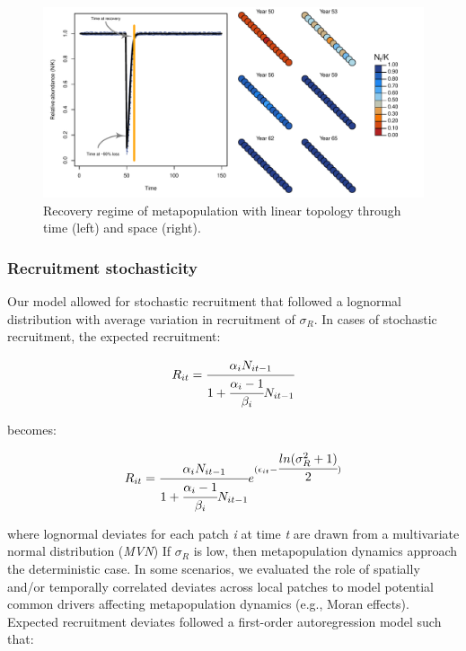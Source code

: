 \documentclass[
]{article}
\begin{document}
\begin{figure}[H]

{\centering \includegraphics{Managing_for_ecological_surprises_in_metapopulations_files/figure-latex/example disturbance regime-1} 

}

\caption{Recovery regime of metapopulation with linear topology through time (left) and space (right).}\label{fig:example disturbance regime}
\end{figure}

\hypertarget{recruitment-stochasticity}{%
\subsubsection{Recruitment
stochasticity}\label{recruitment-stochasticity}}

Our model allowed for stochastic recruitment that followed a lognormal
distribution with average variation in recruitment of \(\sigma_R\). In
cases of stochastic recruitment, the expected recruitment:

\begin{align}
R_{it}=\cfrac{\alpha_iN_{it-1}}{1+\cfrac{\alpha_i-1}{\beta_i}N_{it-1}}
\end{align}

becomes:

\begin{align}
R_{it}=\cfrac{\alpha_iN_{it-1}}{1+\cfrac{\alpha_i-1}{\beta_i}N_{it-1}}e^{(\epsilon_{it}-\cfrac{ln(\sigma_{R}^2+1)}{2})}
\end{align}

where lognormal deviates for each patch \emph{i} at time \emph{t} are
drawn from a multivariate normal distribution (\emph{MVN}) If
\(\sigma_R\) is low, then metapopulation dynamics approach the
deterministic case. In some scenarios, we evaluated the role of
spatially and/or temporally correlated deviates across local patches to
model potential common drivers affecting metapopulation dynamics (e.g.,
Moran effects). Expected recruitment deviates followed a first-order
autoregression model such that:
\end{document}
